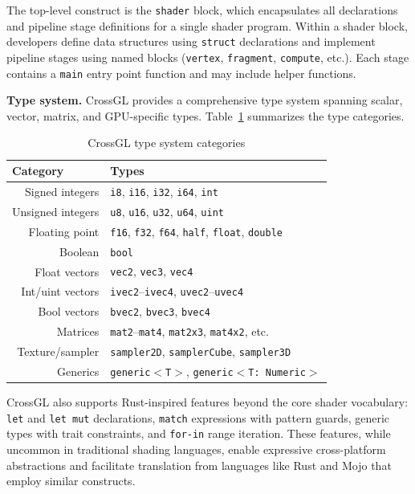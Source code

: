 \documentclass{svproc}
\begin{document}
The top-level construct is the \texttt{shader} block, which encapsulates all declarations and pipeline stage definitions for a single shader program. Within a shader block, developers define data structures using \texttt{struct} declarations and implement pipeline stages using named blocks (\texttt{vertex}, \texttt{fragment}, \texttt{compute}, etc.). Each stage contains a \texttt{main} entry point function and may include helper functions.

\textbf{Type system.} CrossGL provides a comprehensive type system spanning scalar, vector, matrix, and GPU-specific types. Table~\ref{tab:types} summarizes the type categories.

\begin{table}
\caption{CrossGL type system categories}
\label{tab:types}
\begin{center}
\begin{tabular}{r@{\quad}l}
\hline
\multicolumn{1}{l}{\rule{0pt}{12pt}\textbf{Category}} & \textbf{Types} \\[2pt]
\hline\rule{0pt}{12pt}
Signed integers & \texttt{i8}, \texttt{i16}, \texttt{i32}, \texttt{i64}, \texttt{int} \\
Unsigned integers & \texttt{u8}, \texttt{u16}, \texttt{u32}, \texttt{u64}, \texttt{uint} \\
Floating point & \texttt{f16}, \texttt{f32}, \texttt{f64}, \texttt{half}, \texttt{float}, \texttt{double} \\
Boolean & \texttt{bool} \\
Float vectors & \texttt{vec2}, \texttt{vec3}, \texttt{vec4} \\
Int/uint vectors & \texttt{ivec2}--\texttt{ivec4}, \texttt{uvec2}--\texttt{uvec4} \\
Bool vectors & \texttt{bvec2}, \texttt{bvec3}, \texttt{bvec4} \\
Matrices & \texttt{mat2}--\texttt{mat4}, \texttt{mat2x3}, \texttt{mat4x2}, etc. \\
Texture/sampler & \texttt{sampler2D}, \texttt{samplerCube}, \texttt{sampler3D} \\
Generics & \texttt{generic}$<$\texttt{T}$>$, \texttt{generic}$<$\texttt{T: Numeric}$>$ \\[2pt]
\hline
\end{tabular}
\end{center}
\end{table}

CrossGL also supports Rust-inspired features beyond the core shader vocabulary: \texttt{let} and \texttt{let mut} declarations, \texttt{match} expressions with pattern guards, generic types with trait constraints, and \texttt{for-in} range iteration. These features, while uncommon in traditional shading languages, enable expressive cross-platform abstractions and facilitate translation from languages like Rust and Mojo that employ similar constructs.
\end{document}
